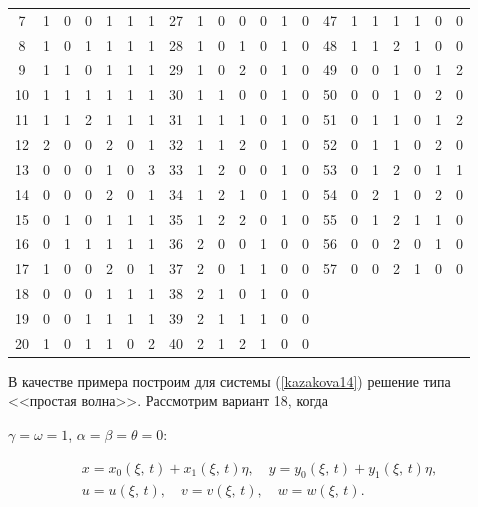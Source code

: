 {\begin{tabular}{c|c|c|c|c|c|c||c|c|c|c|c|c|c ||c|c|c|c|c|c|c }
7&1&0&0&1&1&1&   27&1&0&0&0&1&0&  47&1&1&1&1&0&0\\

8&1&0&1&1&1&1&   28&1&0&1&0&1&0&  48&1&1&2&1&0&0\\

9&1&1&0&1&1&1&   29&1&0&2&0&1&0&  49&0&0&1&0&1&2\\

10&1&1&1&1&1&1&  30&1&1&0&0&1&0&  50&0&0&1&0&2&0\\

11&1&1&2&1&1&1&  31&1&1&1&0&1&0&  51&0&1&1&0&1&2\\

12&2&0&0&2&0&1&  32&1&1&2&0&1&0&  52&0&1&1&0&2&0\\

13&0&0&0&1&0&3&  33&1&2&0&0&1&0&  53&0&1&2&0&1&1\\

14&0&0&0&2&0&1&  34&1&2&1&0&1&0&  54&0&2&1&0&2&0\\

15&0&1&0&1&1&1&  35&1&2&2&0&1&0&  55&0&1&2&1&1&0\\

16&0&1&1&1&1&1&  36&2&0&0&1&0&0&  56&0&0&2&0&1&0\\

17&1&0&0&2&0&1&  37&2&0&1&1&0&0&  57&0&0&2&1&0&0\\

18&0&0&0&1&1&1&  38&2&1&0&1&0&0 \\

19&0&0&1&1&1&1&  39&2&1&1&1&0&0 \\

20&1&0&1&1&0&2&  40&2&1&2&1&0&0 \\





\hline

\end{tabular}



\smallskip

}





В качестве примера построим для системы  (\ref{kazakova14}) решение типа <<простая волна>>. Рассмотрим вариант 18, когда

$\gamma=\omega=1$, $\alpha=\beta=\theta=0$:

\begin{equation}

\label{kazakova16}

\begin{array}{c}

x=x_0(\xi,\,t)+x_1(\xi,\,t)\eta, \quad y=y_0(\xi,\,t) + y_1(\xi,\,t)\eta,\\

u=u(\xi,\,t),\quad  v=v(\xi,\,t), \quad w=w(\xi,\,t).

\end{array}

\end{equation}

